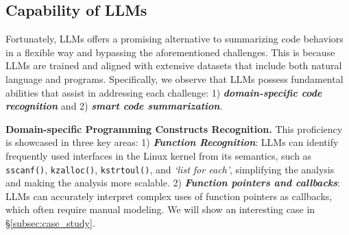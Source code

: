 



\subsection{Capability of LLMs}
\label{subsec:cap}

Fortunately, \acp*{LLM} \cite{openai_2023_gpt_4} offers a promising
alternative to summarizing code behaviors~\cite{openai_training_2022} in a flexible way and bypassing the aforementioned challenges. This is because LLMs
are trained and aligned with extensive datasets that include both natural language and programs. 
Specifically, we observe that LLMs possess fundamental abilities that assist in addressing each challenge: 1) \textit{\textbf{domain-specific code recognition}} and 2) 
\textit{\textbf{smart code summarization}}.

\vspace{3pt}
\noindent
\textbf{Domain-specific Programming Constructs Recognition.} 
This proficiency is showcased in three key areas: 1) \textit{\textbf{Function Recognition}}: LLMs can identify frequently used interfaces in the Linux kernel
from its semantics, such as \texttt{sscanf()}, \texttt{kzalloc()}, \texttt{kstrtoul()}, and  \textit{`list for each'}, simplifying the analysis and making the analysis more scalable.
2) \textit{\textbf{Function pointers and callbacks}}: LLMs can accurately interpret complex uses of function pointers as callbacks, which often require manual modeling. We will show an interesting case in \S\ref{subsec:case_study}.




